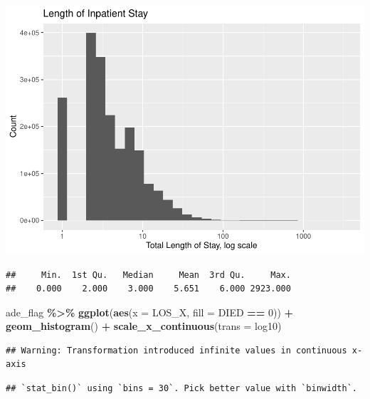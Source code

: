\documentclass[preprint, 3p,
authoryear]{elsarticle} %
\newenvironment{Shaded}{\begin{snugshade}}{\end{snugshade}}
\newcommand{\DataTypeTok}[1]{\textcolor[rgb]{0.13,0.29,0.53}{#1}}
\newcommand{\DecValTok}[1]{\textcolor[rgb]{0.00,0.00,0.81}{#1}}
\newcommand{\KeywordTok}[1]{\textcolor[rgb]{0.13,0.29,0.53}{\textbf{#1}}}
\newcommand{\NormalTok}[1]{#1}
\newcommand{\OperatorTok}[1]{\textcolor[rgb]{0.81,0.36,0.00}{\textbf{#1}}}
\newcommand{\StringTok}[1]{\textcolor[rgb]{0.31,0.60,0.02}{#1}}
\begin{document}
\includegraphics{final-project-paper_files/figure-latex/los-1.pdf}

\begin{Shaded}
\end{Shaded}

\begin{verbatim}
##     Min.  1st Qu.   Median     Mean  3rd Qu.     Max. 
##    0.000    2.000    3.000    5.651    6.000 2923.000
\end{verbatim}

\begin{Shaded}
\begin{Highlighting}[]
\NormalTok{ade\_flag }\OperatorTok{\%\textgreater{}\%}
\StringTok{  }\KeywordTok{ggplot}\NormalTok{(}\KeywordTok{aes}\NormalTok{(}\DataTypeTok{x =}\NormalTok{ LOS\_X, }\DataTypeTok{fill =}\NormalTok{ DIED }\OperatorTok{==}\StringTok{ }\DecValTok{0}\NormalTok{)) }\OperatorTok{+}
\StringTok{  }\KeywordTok{geom\_histogram}\NormalTok{() }\OperatorTok{+}
\StringTok{  }\KeywordTok{scale\_x\_continuous}\NormalTok{(}\DataTypeTok{trans =} \StringTok{\textquotesingle{}log10\textquotesingle{}}\NormalTok{)}
\end{Highlighting}
\end{Shaded}

\begin{verbatim}
## Warning: Transformation introduced infinite values in continuous x-axis
\end{verbatim}

\begin{verbatim}
## `stat_bin()` using `bins = 30`. Pick better value with `binwidth`.
\end{verbatim}
\end{document}
